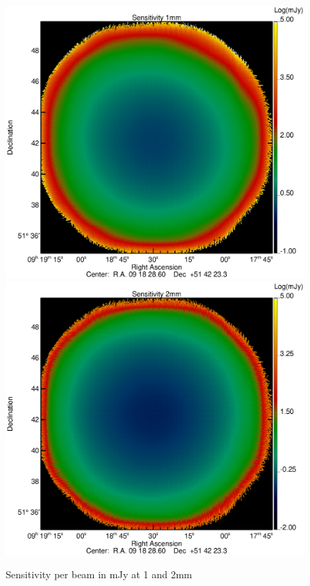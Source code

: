 \begin{figure}[htbp]
\begin{center}
\includegraphics[clip, angle=0, scale = 0.30]{Figures/hls_sensit_1mm_log.eps}
\includegraphics[clip, angle=0, scale = 0.30]{Figures/hls_sensit_2mm_log.eps}
\caption{Sensitivity per beam in mJy at 1 and 2mm}
\label{fig:hls_cov}
\end{center}
\end{figure}


